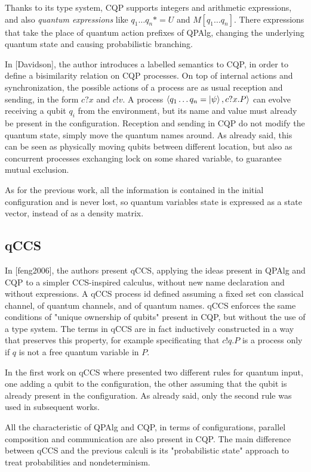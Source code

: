 Thanks to its type system, CQP supports integers and arithmetic expressions, and also \textit{quantum expressions} like $q_1\ldots q_n *= U$ and $M[q_1 \ldots q_n]$. There expressions that take the place of quantum action prefixes of QPAlg, changing the underlying quantum state and causing probabilistic branching.
 

In [Davidson], the author introduces a labelled semantics  to CQP, in order to define a bisimilarity relation on CQP processes. On top of internal actions and synchronization, the possible actions of a process are as usual reception and sending, in the form $c?x$ and $c!v$. A process $\langle q_1 \ldots q_n = \ket{\psi}, c?x.P\rangle$ can evolve receiving a qubit $q_i$ from the environment, but its name and value must already be present in the configuration. Reception and sending in CQP do not modify the quantum state, simply move the quantum names around. As already said, this can be seen as physically moving qubits between different location, but also as concurrent processes exchanging lock on some shared variable, to guarantee mutual exclusion.


As for the previous work, all the information is contained in the initial configuration and is never lost, so quantum variables state is expressed as a state vector, instead of as a density matrix.

\subsection{qCCS}

In [feng2006], the authors present qCCS, applying the ideas present in QPAlg and CQP to a simpler CCS-inspired calculus, without new name declaration and without expressions. A qCCS process id defined assuming a fixed set con classical channel, of quantum channels, and of quantum names. qCCS enforces the same conditions of "unique ownership of qubits" present in CQP, but without the use of a type system. The terms in qCCS are in fact inductively constructed in a way that preserves this property, for example specificating that $c!q.P$ is a process only if $q$ is not a free quantum variable in $P$.


In the first work on qCCS where presented two different rules for quantum input, one adding a qubit to the configuration, the other assuming that the qubit is already present in the configuration. As already said, only the second rule was used in subsequent works.


All the characteristic of QPAlg and CQP, in terms of configurations, parallel composition and communication are also present in CQP. The main difference between qCCS and the previous calculi is its "probabilistic state" approach to treat probabilities and nondeterminism.


